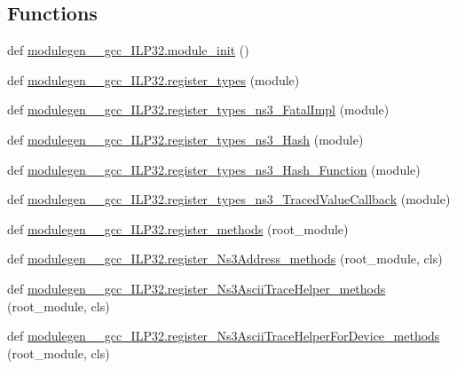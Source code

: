 \subsection*{Functions}
\begin{DoxyCompactItemize}
\item 
def \hyperlink{namespacemodulegen____gcc__ILP32_adeca9ed3c99593bd5eb3b0bd7981c321}{modulegen\+\_\+\+\_\+gcc\+\_\+\+I\+L\+P32.\+module\+\_\+init} ()
\item 
def \hyperlink{namespacemodulegen____gcc__ILP32_af565b2741bb1cd768d289459114389b9}{modulegen\+\_\+\+\_\+gcc\+\_\+\+I\+L\+P32.\+register\+\_\+types} (module)
\item 
def \hyperlink{namespacemodulegen____gcc__ILP32_aab873702fb2d41d9a78db27492ae87a5}{modulegen\+\_\+\+\_\+gcc\+\_\+\+I\+L\+P32.\+register\+\_\+types\+\_\+ns3\+\_\+\+Fatal\+Impl} (module)
\item 
def \hyperlink{namespacemodulegen____gcc__ILP32_a0bce51bcadf44c501181b3a56b927a40}{modulegen\+\_\+\+\_\+gcc\+\_\+\+I\+L\+P32.\+register\+\_\+types\+\_\+ns3\+\_\+\+Hash} (module)
\item 
def \hyperlink{namespacemodulegen____gcc__ILP32_af8a17079f3fe7bb312bb8a09266937fa}{modulegen\+\_\+\+\_\+gcc\+\_\+\+I\+L\+P32.\+register\+\_\+types\+\_\+ns3\+\_\+\+Hash\+\_\+\+Function} (module)
\item 
def \hyperlink{namespacemodulegen____gcc__ILP32_a1410eba4e1bf09d877cd7bd0ae8e66ef}{modulegen\+\_\+\+\_\+gcc\+\_\+\+I\+L\+P32.\+register\+\_\+types\+\_\+ns3\+\_\+\+Traced\+Value\+Callback} (module)
\item 
def \hyperlink{namespacemodulegen____gcc__ILP32_a94ccb7f04a4251f5353b68c8c69cb5fa}{modulegen\+\_\+\+\_\+gcc\+\_\+\+I\+L\+P32.\+register\+\_\+methods} (root\+\_\+module)
\item 
def \hyperlink{namespacemodulegen____gcc__ILP32_afc9e83375dc30250cd5d7973f09379a5}{modulegen\+\_\+\+\_\+gcc\+\_\+\+I\+L\+P32.\+register\+\_\+\+Ns3\+Address\+\_\+methods} (root\+\_\+module, cls)
\item 
def \hyperlink{namespacemodulegen____gcc__ILP32_aacf90cbd3fb384363506494c3c26b063}{modulegen\+\_\+\+\_\+gcc\+\_\+\+I\+L\+P32.\+register\+\_\+\+Ns3\+Ascii\+Trace\+Helper\+\_\+methods} (root\+\_\+module, cls)
\item 
def \hyperlink{namespacemodulegen____gcc__ILP32_a7eacac7fc36be83fed44c2980e7456e6}{modulegen\+\_\+\+\_\+gcc\+\_\+\+I\+L\+P32.\+register\+\_\+\+Ns3\+Ascii\+Trace\+Helper\+For\+Device\+\_\+methods} (root\+\_\+module, cls)
\item 

\end{DoxyCompactItemize}

